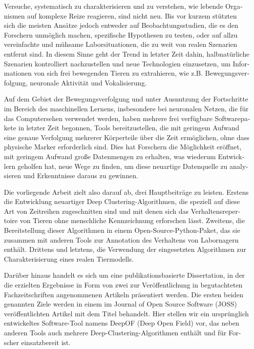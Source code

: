 \begin{otherlanguage}{german}

Versuche, systematisch zu charakterisieren und zu verstehen, wie lebende Organismen auf komplexe Reize reagieren, sind nicht neu. Bis vor kurzem stützten sich die meisten Ansätze jedoch entweder auf Beobachtungsstudien, die es den Forschern unmöglich machen, spezifische Hypothesen zu testen, oder auf allzu vereinfachte und mühsame Laborsituationen, die zu weit von realen Szenarien entfernt sind. In diesem Sinne geht der Trend in letzter Zeit dahin, halbnatürliche Szenarien kontrolliert nachzustellen und neue Technologien einzusetzen, um Informationen von sich frei bewegenden Tieren zu extrahieren, wie z.B. Bewegungsverfolgung, neuronale Aktivität und Vokalisierung.

Auf dem Gebiet der Bewegungsverfolgung und unter Ausnutzung der Fortschritte im Bereich des maschinellen Lernens, insbesondere bei neuronalen Netzen, die für das Computersehen verwendet werden, haben mehrere frei verfügbare Softwarepakete in letzter Zeit begonnen, Tools bereitzustellen, die mit geringem Aufwand eine genaue Verfolgung mehrerer Körperteile über die Zeit ermöglichen, ohne dass physische Marker erforderlich sind. Dies hat Forschern die Möglichkeit eröffnet, mit geringem Aufwand große Datenmengen zu erhalten, was wiederum Entwicklern geholfen hat, neue Wege zu finden, um diese neuartige Datenquelle zu analysieren und Erkenntnisse daraus zu gewinnen.

Die vorliegende Arbeit zielt also darauf ab, drei Hauptbeiträge zu leisten. Erstens die Entwicklung neuartiger Deep Clustering-Algorithmen, die speziell auf diese Art von Zeitreihen zugeschnitten sind und mit denen sich das Verhaltensrepertoire von Tieren ohne menschliche Kennzeichnung erforschen lässt. Zweitens, die Bereitstellung dieser Algorithmen in einem Open-Source-Python-Paket, das sie zusammen mit anderen Tools zur Annotation des Verhaltens von Labornagern enthält. Drittens und letztens, die Verwendung der eingesetzten Algorithmen zur Charakterisierung eines realen Tiermodells.

Darüber hinaus handelt es sich um eine publikationsbasierte Dissertation, in der die erzielten Ergebnisse in Form von zwei zur Veröffentlichung in begutachteten Fachzeitschriften angenommenen Artikeln präsentiert werden. Die ersten beiden genannten Ziele werden in einem im Journal of Open Source Software (JOSS) veröffentlichten Artikel mit dem Titel \josstitle behandelt. Hier stellen wir ein ursprünglich entwickeltes Software-Tool namens DeepOF (Deep Open Field) vor, das neben anderen Tools auch mehrere Deep-Clustering-Algorithmen enthält und für Forscher einsatzbereit ist. 


\end{otherlanguage}

